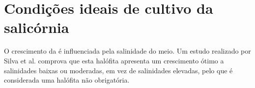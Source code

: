 \section{Condições ideais de cultivo da salicórnia}

O crescimento da \sr é influenciada pela salinidade do meio. Um estudo realizado por Silva et al.\cite{Silva2007} comprova que esta halófita apresenta um crescimento ótimo a salinidades baixas ou moderadas, em vez de salinidades elevadas, pelo que é considerada uma halófita não obrigatória.











